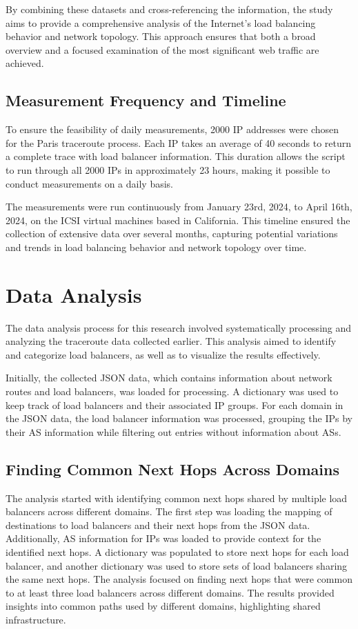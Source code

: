 \documentclass[12pt]{cwru_thesis}
\begin{document}
By combining these datasets and cross-referencing the information, the study aims to provide a comprehensive analysis of the Internet's load balancing behavior and network topology. This approach ensures that both a broad overview and a focused examination of the most significant web traffic are achieved.

\subsection{Measurement Frequency and Timeline}

To ensure the feasibility of daily measurements, 2000 IP addresses were chosen for the Paris traceroute process. Each IP takes an average of 40 seconds to return a complete trace with load balancer information. This duration allows the script to run through all 2000 IPs in approximately 23 hours, making it possible to conduct measurements on a daily basis.

The measurements were run continuously from January 23rd, 2024, to April 16th, 2024, on the ICSI virtual machines based in California. This timeline ensured the collection of extensive data over several months, capturing potential variations and trends in load balancing behavior and network topology over time.



\section{Data Analysis}

The data analysis process for this research involved systematically processing and analyzing the traceroute data collected earlier. This analysis aimed to identify and categorize load balancers, as well as to visualize the results effectively.

Initially, the collected JSON data, which contains information about network routes and load balancers, was loaded for processing. A dictionary was used to keep track of load balancers and their associated IP groups. For each domain in the JSON data, the load balancer information was processed, grouping the IPs by their AS information while filtering out entries without information about ASs.

\subsection{Finding Common Next Hops Across Domains}
The analysis started with identifying common next hops shared by multiple load balancers across different domains. The first step was loading the mapping of destinations to load balancers and their next hops from the JSON data. Additionally, AS information for IPs was loaded to provide context for the identified next hops. A dictionary was populated to store next hops for each load balancer, and another dictionary was used to store sets of load balancers sharing the same next hops. The analysis focused on finding next hops that were common to at least three load balancers across different domains. The results provided insights into common paths used by different domains, highlighting shared infrastructure.
\end{document}
